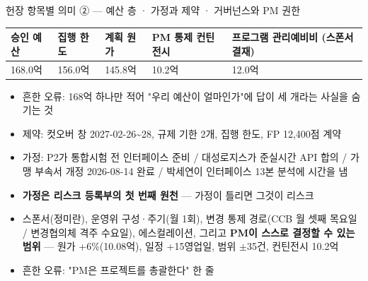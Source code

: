 \begin{frame}[allowframebreaks=1.0]{헌장 항목별 의미 ② — 예산 층 · 가정과 제약 · 거버넌스와 PM 권한}
\small
\par\smallskip{}\nobreak
{\footnotesize\setlength{\tabcolsep}{3pt}\renewcommand{\arraystretch}{1.12}
\begin{tabular}{@{}>{\raggedright\arraybackslash}p{}>{\raggedright\arraybackslash}p{}>{\raggedright\arraybackslash}p{}>{\raggedright\arraybackslash}p{}>{\raggedright\arraybackslash}p{}@{}}
\toprule
\textbf{승인 예산} & \textbf{집행 한도} & \textbf{계획 원가} & \textbf{PM 통제 컨틴전시} & \textbf{프로그램 관리예비비 (스폰서 결재)} \\
\midrule
168.0억 & 156.0억 & 145.8억 & 10.2억 & 12.0억 \\
\bottomrule
\end{tabular}}
\par\smallskip
\begin{itemize}
\item\relax 흔한 오류: 168억 하나만 적어 "우리 예산이 얼마인가"에 답이 세 개라는 사실을 숨기는 것
\end{itemize}
\par\smallskip{}\nobreak
\begin{itemize}
\item\relax 제약: 컷오버 창 2027-02-26\textasciitilde{}28, 규제 기한 2개, 집행 한도, FP 12,400점 계약
\item\relax 가정: P2가 통합시험 전 인터페이스 준비 / 대성로지스가 준실시간 API 합의 / 가맹 부속서 개정 2026-08-14 완료 / 박세연이 인터페이스 13본 분석에 시간을 냄
\item\relax \textbf{가정은 리스크 등록부의 첫 번째 원천} — 가정이 틀리면 그것이 리스크
\end{itemize}
\par\smallskip{}\nobreak
\begin{itemize}
\item\relax 스폰서(정미란), 운영위 구성·주기(월 1회), 변경 통제 경로(CCB 월 셋째 목요일 / 변경협의체 격주 수요일), 에스컬레이션, 그리고 \textbf{PM이 스스로 결정할 수 있는 범위} — 원가 +6\%(10.08억), 일정 +15영업일, 범위 $\pm$35건, 컨틴전시 10.2억
\item\relax 흔한 오류: "PM은 프로젝트를 총괄한다" 한 줄
\end{itemize}
\end{frame}


